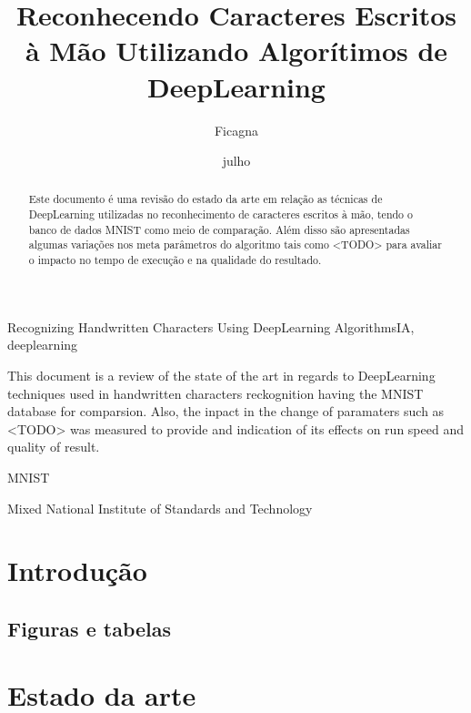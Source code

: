 \documentclass[cic,tc]{iiufrgs}
\title{Reconhecendo Caracteres Escritos à Mão Utilizando Algorítimos de DeepLearning}
\author{Ficagna}{Alan}
\date{julho}{2015}
\begin{document}
\maketitle

\begin{abstract}

    Este documento é uma revisão do estado da arte em relação as técnicas de
    DeepLearning utilizadas no reconhecimento de caracteres escritos à mão,
    tendo o banco de dados MNIST como meio de comparação. Além disso são
    apresentadas algumas variações nos meta parâmetros do algoritmo tais como
    <TODO> para avaliar o impacto no tempo de execução e na qualidade do
    resultado.
\end{abstract}

\begin{englishabstract}{Recognizing Handwritten Characters Using DeepLearning Algorithms}{IA, deeplearning}

  This document is a review of the state of the art in regards to DeepLearning
  techniques used in handwritten characters reckognition having the MNIST
  database for comparsion. Also, the inpact in the change of paramaters such as
  <TODO> was measured to provide and indication of its effects on run speed and
  quality of result.

\end{englishabstract}

\listoffigures
\listoftables
\begin{listofabbrv}{MNIST}
 \item[MNIST] Mixed National Institute of Standards and Technology
\end{listofabbrv}
\tableofcontents

\chapter{Introdução}
\section{Figuras e tabelas}

\chapter{Estado da arte}
\end{document}
